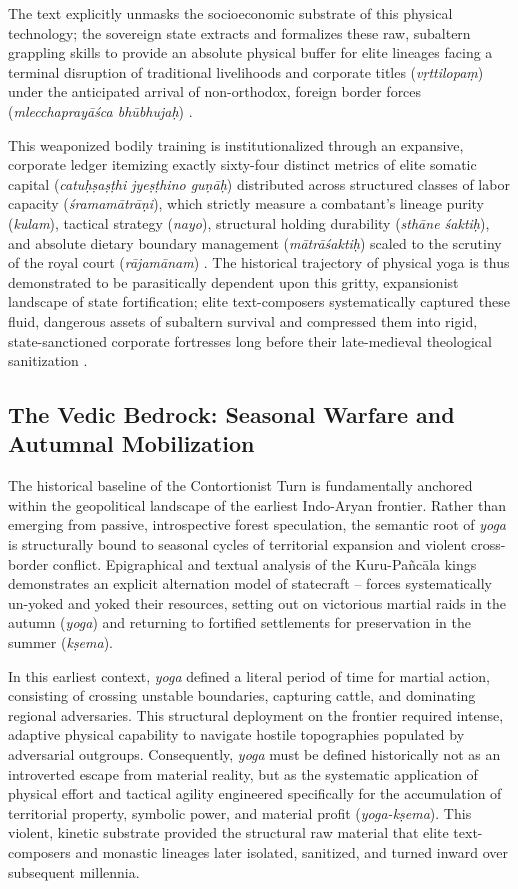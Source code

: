 \documentclass[11pt,twoside,letterpaper]{article}
\begin{document}
The text explicitly unmasks the socioeconomic substrate of this physical technology; the sovereign state extracts and formalizes these raw, subaltern grappling skills to provide an absolute physical buffer for elite lineages facing a terminal disruption of traditional livelihoods and corporate titles (\textit{vṛttilopaṃ}) under the anticipated arrival of non-orthodox, foreign border forces (\textit{mlecchaprayāśca bhūbhujaḥ}) \citep{MP_7}. 

This weaponized bodily training is institutionalized through an expansive, corporate ledger itemizing exactly sixty-four distinct metrics of elite somatic capital (\textit{catuḥṣaṣṭhi jyeṣṭhino guṇāḥ}) distributed across structured classes of labor capacity (\textit{śramamātrāṇi}), which strictly measure a combatant's lineage purity (\textit{kulam}), tactical strategy (\textit{nayo}), structural holding durability (\textit{sthāne śaktiḥ}), and absolute dietary boundary management (\textit{mātrāśaktiḥ}) scaled to the scrutiny of the royal court (\textit{rājamānam}) \citep{MP_7, Olivelle2011}. The historical trajectory of physical yoga is thus demonstrated to be parasitically dependent upon this gritty, expansionist landscape of state fortification; elite text-composers systematically captured these fluid, dangerous assets of subaltern survival and compressed them into rigid, state-sanctioned corporate fortresses long before their late-medieval theological sanitization \citep{MP_7, Wujastyk2025}.


\subsection{The Vedic Bedrock: Seasonal Warfare and Autumnal Mobilization}
The historical baseline of the Contortionist Turn is fundamentally anchored within the geopolitical landscape of the earliest Indo-Aryan frontier. Rather than emerging from passive, introspective forest speculation, the semantic root of \textit{yoga} is structurally bound to seasonal cycles of territorial expansion and violent cross-border conflict. Epigraphical and textual analysis of the Kuru-Pañcāla kings demonstrates an explicit alternation model of statecraft -- forces systematically un-yoked and yoked their resources, setting out on victorious martial raids in the autumn (\textit{yoga}) and returning to fortified settlements for preservation in the summer (\textit{kṣema}).

In this earliest context, \textit{yoga} defined a literal period of time for martial action, consisting of crossing unstable boundaries, capturing cattle, and dominating regional adversaries. This structural deployment on the frontier required intense, adaptive physical capability to navigate hostile topographies populated by adversarial outgroups. Consequently, \textit{yoga} must be defined historically not as an introverted escape from material reality, but as the systematic application of physical effort and tactical agility engineered specifically for the accumulation of territorial property, symbolic power, and material profit (\textit{yoga-kṣema}). This violent, kinetic substrate provided the structural raw material that elite text-composers and monastic lineages later isolated, sanitized, and turned inward over subsequent millennia.
\end{document}
